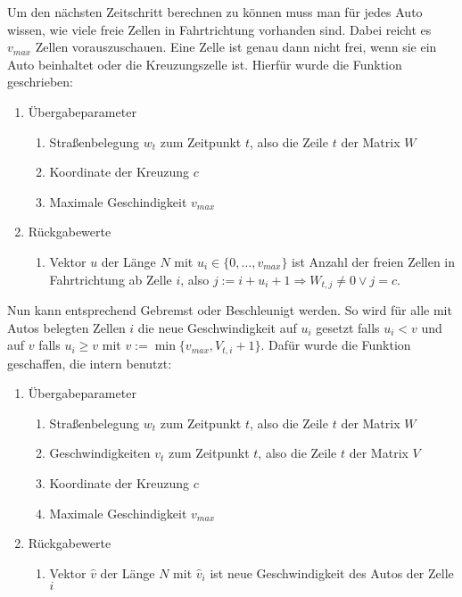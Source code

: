 Um den nächsten Zeitschritt berechnen zu können muss man für jedes Auto wissen, wie viele freie Zellen 
in Fahrtrichtung vorhanden sind. Dabei reicht es \(v_{max}\) Zellen vorauszuschauen. 
Eine Zelle ist genau dann nicht frei, wenn sie ein Auto beinhaltet oder
die Kreuzungszelle ist. Hierfür wurde die Funktion  geschrieben:
\begin{enumerate}
  \item Übergabeparameter
    \begin{enumerate}
      \item Straßenbelegung \(w_t\) zum Zeitpunkt \(t\),  also die Zeile \(t\) der Matrix \(W\)       
      \item Koordinate der Kreuzung \(c\) 
      \item Maximale Geschindigkeit \(v_{max}\)
    \end{enumerate}
  \item Rückgabewerte
    \begin{enumerate}
      \item Vektor \(u\) der Länge \(N\) mit \(u_i \in \{0, \ldots, v_{max} \}\) ist Anzahl der freien 
        Zellen in Fahrtrichtung ab Zelle \(i\), also \(j := i + u_i + 1 \Rightarrow W_{t,j} \neq 0 \lor j = c\).
    \end{enumerate}
\end{enumerate}
Nun kann entsprechend Gebremst oder Beschleunigt werden. So wird für alle mit Autos belegten Zellen \(i\)
die neue Geschwindigkeit auf \(u_i\) gesetzt falls \(u_i < v\) und auf \(v\) falls \(u_i \geq v\) mit
\( v := \min\{ v_{max}, V_{t,i}+1 \}\).  
Dafür wurde die Funktion  geschaffen, die intern  benutzt:
\begin{enumerate}
  \item Übergabeparameter
    \begin{enumerate}
      \item Straßenbelegung \(w_t\) zum Zeitpunkt \(t\),  also die Zeile \(t\) der Matrix \(W\)       
      \item Geschwindigkeiten \(v_t\) zum Zeitpunkt \(t\),  also die Zeile \(t\) der Matrix \(V\)       
      \item Koordinate der Kreuzung \(c\) 
      \item Maximale Geschindigkeit \(v_{max}\)
    \end{enumerate}
  \item Rückgabewerte
    \begin{enumerate}
      \item Vektor \(\hat{v}\) der Länge \(N\) mit \(\hat{v}_i\) ist neue Geschwindigkeit des Autos der Zelle \(i\)
    \end{enumerate}
\end{enumerate}
